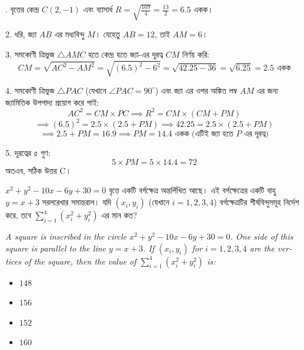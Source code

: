 \documentclass[12pt, a4paper]{article}
\begin{document}
\begin{tcolorbox}[solutionbox={সমাধান (Solution)}]
    . বৃত্তের কেন্দ্র $C(2, -1)$ এবং ব্যাসার্ধ $R = \sqrt{\frac{169}{4}} = \frac{13}{2} = 6.5$ একক।
    
    2. ধরি, জ্যা $AB$ এর মধ্যবিন্দু $M$। যেহেতু $AB = 12$, তাই $AM = 6$।
    
    \vspace{0.5em}
    3. সমকোণী ত্রিভুজ $\triangle AMC$ হতে কেন্দ্র হতে জ্যা-এর দূরত্ব $CM$ নির্ণয় করি:
    \[ CM = \sqrt{AC^2 - AM^2} = \sqrt{(6.5)^2 - 6^2} = \sqrt{42.25 - 36} = \sqrt{6.25} = 2.5 \text{ একক} \]
    
    4. সমকোণী ত্রিভুজ $\triangle PAC$ (যেখানে $\angle PAC = 90^{\circ}$) এবং জ্যা এর ওপর অঙ্কিত লম্ব $AM$ এর জন্য জ্যামিতিক উপপাদ্য প্রয়োগ করে পাই:
    \[ AC^2 = CM \times PC \implies R^2 = CM \times (CM + PM) \]
    \[ \implies (6.5)^2 = 2.5 \times (2.5 + PM) \implies 42.25 = 2.5 \times (2.5 + PM) \]
    \[ \implies 2.5 + PM = 16.9 \implies PM = 14.4 \text{ একক (এটিই জ্যা হতে $P$ এর দূরত্ব)} \]
    
    5. দূরত্বের ৫ গুণ: 
    \[ 5 \times PM = 5 \times 14.4 = 72 \]
    অতএব, সঠিক উত্তর C।
\end{tcolorbox}

\begin{tcolorbox}[questionbox={প্রশ্ন (Question) 47}]
    \noindent
    $x^2 + y^2 - 10x - 6y + 30 = 0$ বৃত্তে একটি বর্গক্ষেত্র অন্তর্লিখিত আছে। এই বর্গক্ষেত্রের একটি বাহু $y = x + 3$ সরলরেখার সমান্তরাল। যদি $(x_i, y_i)$ (যেখানে $i=1,2,3,4$) বর্গক্ষেত্রটির শীর্ষবিন্দুসমূহ নির্দেশ করে, তবে $\sum_{i=1}^4 (x_i^2 + y_i^2)$ এর মান কত?
    
    \vspace{0.8em}
    \begin{english}
    \noindent\textit{\color{darkgray}
    A square is inscribed in the circle $x^2 + y^2 - 10x - 6y + 30 = 0$. One side of this square is parallel to the line $y = x + 3$. If $(x_i, y_i)$ for $i=1,2,3,4$ are the vertices of the square, then the value of $\sum_{i=1}^4 (x_i^2 + y_i^2)$ is:
    }
    \end{english}
\end{tcolorbox}

\begin{itemize}[label={}, leftmargin=1cm, itemsep=0.5em]
    \item[\textbf{A)}] $148$
    \item[\textbf{B)}] $156$
    \item[\textbf{C)}] $152$
    \item[\textbf{D)}] $160$
\end{itemize}
\end{document}
